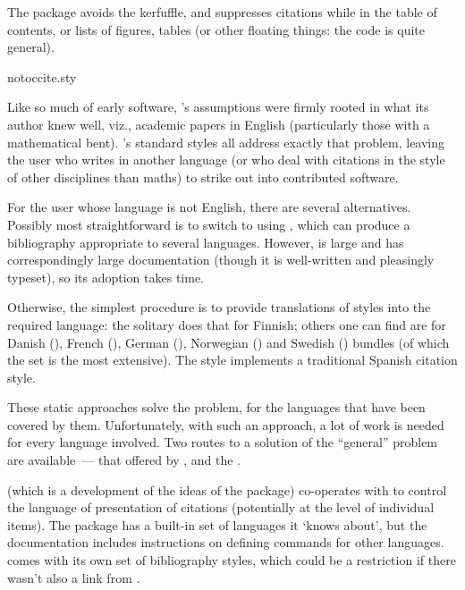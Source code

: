 The package  avoids the kerfuffle, and suppresses
citations while in the table of contents, or lists of figures, tables
(or other floating things: the code is quite general).
\begin{ctanrefs}
\item[notoccite.sty]
\end{ctanrefs}


Like so much of early \AllTeX{} software, \BibTeX{}'s assumptions were
firmly rooted in what its author knew well, viz., academic papers in
English (particularly those with a mathematical bent).  \BibTeX{}'s
standard styles all address exactly that problem, leaving the user who
writes in another language (or who deal with citations in the style of
other disciplines than maths) to strike out into contributed software.

For the user whose language is not English, there are several
alternatives.  Possibly most straightforward is to switch to using
, which can produce a bibliography appropriate to
several languages.  However,  is large and has
correspondingly large documentation (though it is well-written and
pleasingly typeset), so its adoption takes time.

Otherwise, the simplest procedure is to provide translations of
\BibTeX{} styles into the
required language: the solitary  does that for
Finnish; others one can find are for Danish (), French
(), German (), Norwegian
() and Swedish () bundles (of which
the  set is the most extensive).  The 
style implements a traditional Spanish citation style.

These static approaches solve the problem, for the languages that have
been covered by them.  Unfortunately, with such an approach, a lot of
work is needed for every language involved.  Two routes to a solution
of the ``general'' problem are available~--- that offered by
, and the %
.

 (which is a development of the ideas of the
 package) co-operates with  to control
the language of presentation of citations (potentially at the level of
individual items).  The package has a built-in set of languages it
`knows about', but the documentation includes instructions on defining
commands for other languages.   comes with its own
set of bibliography styles, which could be a restriction if there
wasn't also a link from .

